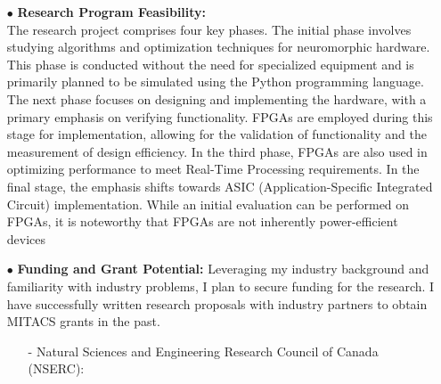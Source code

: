 \begin {itemize}
\begin{itemize}
  Throughout my time as part-time research associate at University of Windsor,  a method was presenting for reducing power consumption in an artificial neural network, the method comprising: receiving an input signal; modulating a sampling frequency of an artificial neuron based on the input signal; and forwarding the input signal or a further input signal obtained from the input signal to the artificial neuron at the sampling frequency. 
A US patent was obtained for the proposed method  [6]. 

In another work, Selective Input Sparsity (SIS) method proposed for edge inference applications in image classification where the image acquisition environment is controlled. These sparsely connected networks are well-suited to area-constrained applications as they require fewer neurons and synapses than baseline Fully Connected (FC) networks of analogous structures. The SIS networks require fewer hardware resources and make inferences faster than the baseline FC networks without substantial impact on the classification accuracy [7].
 \item [$\bullet$] { \bf Research Program Feasibility:} \vspace{0.5em} \\
The research project comprises four key phases. The initial phase involves studying algorithms and optimization techniques for neuromorphic hardware. This phase is conducted without the need for specialized equipment and is primarily planned to be simulated using the Python programming language. The next phase focuses on designing and implementing the hardware, with a primary emphasis on verifying functionality. FPGAs are employed during this stage for implementation, allowing for the validation of functionality and the measurement of design efficiency. In the third phase, FPGAs are also used in optimizing performance to meet Real-Time Processing requirements. In the final stage, the emphasis shifts towards ASIC (Application-Specific Integrated Circuit) implementation. While an initial evaluation can be performed on FPGAs, it is noteworthy that FPGAs are not inherently power-efficient devices
\item [$\bullet$] { \bf Funding and Grant Potential:} 
Leveraging my industry background and familiarity with industry problems, I plan to secure funding for the research. I have successfully written research proposals with industry partners to obtain MITACS grants in the past. 
 \begin {itemize}
    \item [-]  Natural Sciences and Engineering Research Council of Canada (NSERC):

\end{itemize}
\end{itemize}
\end{itemize}
